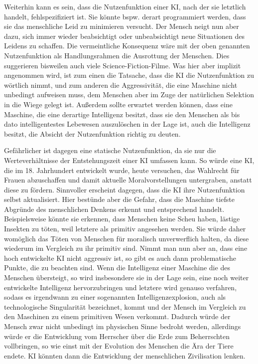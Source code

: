 Weiterhin kann es sein, dass die Nutzenfunktion einer KI, nach der sie letztlich handelt, fehlspezifiziert ist.
Sie könnte bspw.
derart programmiert werden, dass sie das menschliche Leid zu minimieren versucht.
Der Mensch neigt nun aber dazu, sich immer wieder beabsichtigt oder unbeabsichtigt neue Situationen des Leidens zu schaffen.
Die vermeintliche Konsequenz
wäre mit der oben genannten Nutzenfunktion als Handlungsrahmen die Ausrottung der
Menschen.
Dies suggerieren bisweilen auch viele Science-Fiction-Filme.
Was hier aber implizit angenommen wird, ist zum einen die Tatsache, dass die KI die Nutzenfunktion zu wörtlich nimmt, und zum anderen die Aggressivität, die eine Maschine nicht unbedingt aufweisen muss, dem Menschen aber im Zuge der natürlichen Selektion in die Wiege gelegt ist.
Außerdem sollte erwartet werden können, dass eine Maschine, die eine derartige Intelligenz besitzt, dass sie den Menschen als bis dato intelligentestes Lebewesen auszulöschen in der Lage ist, auch die Intelligenz besitzt, die Absicht der Nutzenfunktion richtig zu deuten.

Gefährlicher ist dagegen eine statische Nutzenfunktion, da sie nur die Werteverhältnisse der Entstehungszeit einer KI umfassen kann.
So würde eine KI, die im 18.
Jahrhundert entwickelt wurde, heute versuchen, das Wahlrecht für Frauen abzuschaffen und damit aktuelle Moralvorstellungen untergraben, anstatt diese zu fördern.
Sinnvoller erscheint dagegen, dass die KI ihre Nutzenfunktion selbst aktualisiert.
Hier bestünde aber die Gefahr, dass die Maschine tiefste Abgründe des menschlichen Denkens erkennt und entsprechend handelt.
Beispielsweise könnte sie erkennen, dass Menschen keine Scheu haben, lästige Insekten zu töten, weil letztere als primitiv angesehen werden.
Sie würde daher womöglich das Töten von Menschen für moralisch unverwerflich halten, da diese wiederum im Vergleich zu ihr primitiv sind.
Nimmt man nun aber an, dass eine hoch entwickelte KI nicht aggressiv ist, so gibt es auch dann problematische Punkte, die zu beachten sind.
Wenn die Intelligenz einer Maschine die des Menschen übersteigt, so wird insbesondere sie in der Lage sein, eine noch weiter entwickelte Intelligenz hervorzubringen und letztere wird genauso verfahren, sodass es irgendwann zu einer sogenannten Intelligenzexplosion, auch als technologische Singularität bezeichnet, kommt und der Mensch im Vergleich zu den Maschinen zu einem primitiven Wesen verkommt.
Dadurch würde der Mensch zwar nicht unbedingt im physischen Sinne bedroht werden, allerdings würde er die Entwicklung vom Herrscher über die Erde zum Beherrschten vollbringen, so wie einst mit der Evolution des Menschen die Ära der Tiere endete.
KI könnten dann die Entwicklung der menschlichen Zivilisation lenken.

